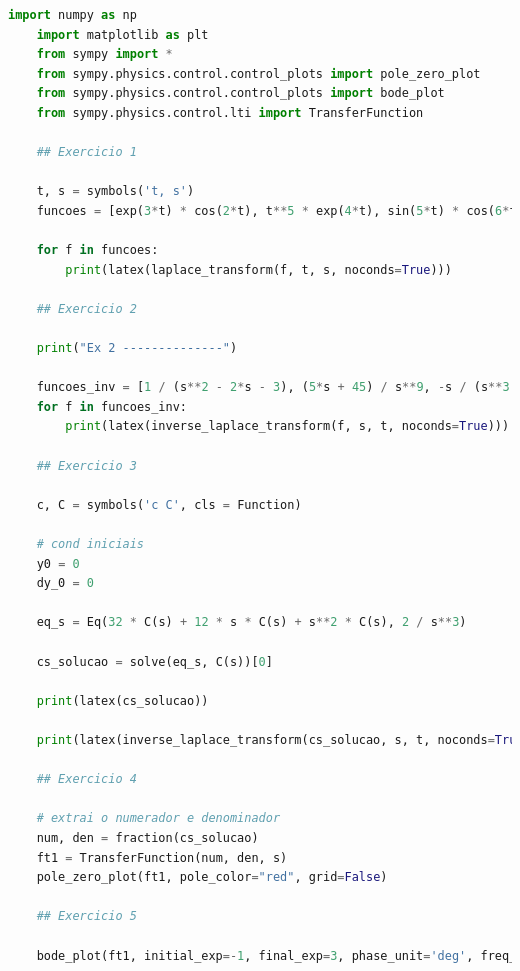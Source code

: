 \documentclass[12pt]{scrartcl}
\begin{document}
\begin{lstlisting}[language=Python, breaklines=true, basicstyle=\scriptsize]
    import numpy as np
    import matplotlib as plt
    from sympy import *
    from sympy.physics.control.control_plots import pole_zero_plot
    from sympy.physics.control.control_plots import bode_plot
    from sympy.physics.control.lti import TransferFunction
    
    ## Exercicio 1
    
    t, s = symbols('t, s')
    funcoes = [exp(3*t) * cos(2*t), t**5 * exp(4*t), sin(5*t) * cos(6*t), sinh(t)]
    
    for f in funcoes:
        print(latex(laplace_transform(f, t, s, noconds=True)))
    
    ## Exercicio 2
    
    print("Ex 2 --------------")
    
    funcoes_inv = [1 / (s**2 - 2*s - 3), (5*s + 45) / s**9, -s / (s**3 + 1), (s**3 + 81) / (s**4 + 12 * s**2 + 11)]
    for f in funcoes_inv:
        print(latex(inverse_laplace_transform(f, s, t, noconds=True)))
    
    ## Exercicio 3
    
    c, C = symbols('c C', cls = Function)
    
    # cond iniciais
    y0 = 0
    dy_0 = 0
    
    eq_s = Eq(32 * C(s) + 12 * s * C(s) + s**2 * C(s), 2 / s**3)
    
    cs_solucao = solve(eq_s, C(s))[0]
    
    print(latex(cs_solucao))
    
    print(latex(inverse_laplace_transform(cs_solucao, s, t, noconds=True)))
    
    ## Exercicio 4
    
    # extrai o numerador e denominador
    num, den = fraction(cs_solucao)
    ft1 = TransferFunction(num, den, s)
    pole_zero_plot(ft1, pole_color="red", grid=False)
    
    ## Exercicio 5
    
    bode_plot(ft1, initial_exp=-1, final_exp=3, phase_unit='deg', freq_unit='Hz')
\end{lstlisting}
\end{document}
